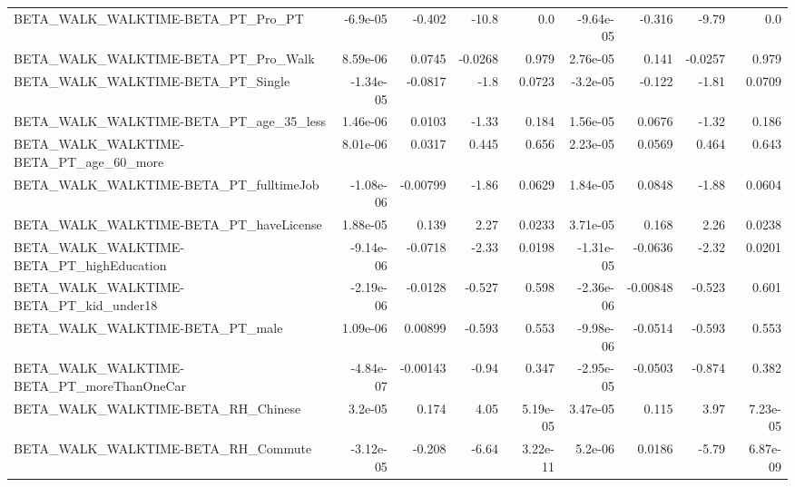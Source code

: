 \begin{tabular}{lrrrrrrrr}
BETA\_WALK\_WALKTIME-BETA\_PT\_Pro\_PT                  &    -6.9e-05 &       -0.402 &     -10.8 &      0.0 &  -9.64e-05 &      -0.316 &        -9.79 &           0.0 \\
BETA\_WALK\_WALKTIME-BETA\_PT\_Pro\_Walk                &    8.59e-06 &       0.0745 &   -0.0268 &    0.979 &   2.76e-05 &       0.141 &      -0.0257 &         0.979 \\
BETA\_WALK\_WALKTIME-BETA\_PT\_Single                  &   -1.34e-05 &      -0.0817 &      -1.8 &   0.0723 &   -3.2e-05 &      -0.122 &        -1.81 &        0.0709 \\
BETA\_WALK\_WALKTIME-BETA\_PT\_age\_35\_less             &    1.46e-06 &       0.0103 &     -1.33 &    0.184 &   1.56e-05 &      0.0676 &        -1.32 &         0.186 \\
BETA\_WALK\_WALKTIME-BETA\_PT\_age\_60\_more             &    8.01e-06 &       0.0317 &     0.445 &    0.656 &   2.23e-05 &      0.0569 &        0.464 &         0.643 \\
BETA\_WALK\_WALKTIME-BETA\_PT\_fulltimeJob             &   -1.08e-06 &     -0.00799 &     -1.86 &   0.0629 &   1.84e-05 &      0.0848 &        -1.88 &        0.0604 \\
BETA\_WALK\_WALKTIME-BETA\_PT\_haveLicense             &    1.88e-05 &        0.139 &      2.27 &   0.0233 &   3.71e-05 &       0.168 &         2.26 &        0.0238 \\
BETA\_WALK\_WALKTIME-BETA\_PT\_highEducation           &   -9.14e-06 &      -0.0718 &     -2.33 &   0.0198 &  -1.31e-05 &     -0.0636 &        -2.32 &        0.0201 \\
BETA\_WALK\_WALKTIME-BETA\_PT\_kid\_under18             &   -2.19e-06 &      -0.0128 &    -0.527 &    0.598 &  -2.36e-06 &    -0.00848 &       -0.523 &         0.601 \\
BETA\_WALK\_WALKTIME-BETA\_PT\_male                    &    1.09e-06 &      0.00899 &    -0.593 &    0.553 &  -9.98e-06 &     -0.0514 &       -0.593 &         0.553 \\
BETA\_WALK\_WALKTIME-BETA\_PT\_moreThanOneCar          &   -4.84e-07 &     -0.00143 &     -0.94 &    0.347 &  -2.95e-05 &     -0.0503 &       -0.874 &         0.382 \\
BETA\_WALK\_WALKTIME-BETA\_RH\_Chinese                 &     3.2e-05 &        0.174 &      4.05 & 5.19e-05 &   3.47e-05 &       0.115 &         3.97 &      7.23e-05 \\
BETA\_WALK\_WALKTIME-BETA\_RH\_Commute                 &   -3.12e-05 &       -0.208 &     -6.64 & 3.22e-11 &    5.2e-06 &      0.0186 &        -5.79 &      6.87e-09 \\

\end{tabular}
